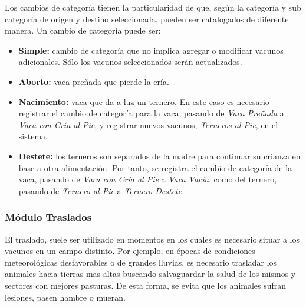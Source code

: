 \documentclass[11pt,oneside]{book}
\begin{document}
Los cambios de categoría tienen la particularidad de que, según la categoría y sub categoría de origen y destino seleccionada, pueden ser catalogados de diferente manera. Un cambio de categoría puede ser:
\begin{itemize}
\item \textbf{Simple:} cambio de categoría que no implica agregar o modificar vacunos adicionales. Sólo los vacunos seleccionados serán  actualizados.
\item \textbf{Aborto:} vaca preñada que pierde la cría.
\item \textbf{Nacimiento:} vaca que da a luz un ternero. En este caso es necesario registrar el cambio de categoría para la vaca, pasando de \textit{Vaca Preñada} a \textit{Vaca con Cría al Pie}, y registrar nuevos vacunos, \textit{Terneros al Pie}, en el sistema.
\item \textbf{Destete:} los terneros son separados de la madre para continuar su crianza en base a otra alimentación. Por tanto, se registra el cambio de categoría de la vaca, pasando de \textit{Vaca con Cría al Pie} a \textit{Vaca Vacía}, como del ternero, pasando de \textit{Ternero al Pie} a \textit{Ternero Destete}.
\end{itemize}

\subsubsection{Módulo Traslados}
El traslado, suele ser utilizado en momentos en los cuales es necesario situar a los vacunos en un campo distinto. Por ejemplo, en épocas de condiciones meteorológicas desfavorables o de grandes lluvias, es necesario trasladar los animales hacia tierras mas altas buscando salvaguardar la salud de los mismos y sectores con mejores pasturas. De esta forma, se evita que los animales sufran lesiones, pasen hambre o mueran.
\end{document}
